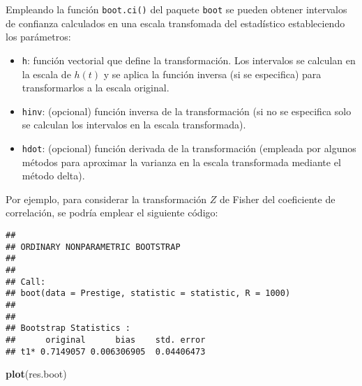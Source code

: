 \documentclass[
]{book}
\newenvironment{Shaded}{\begin{snugshade}}{\end{snugshade}}
\newcommand{\ControlFlowTok}[1]{\textcolor[rgb]{0.13,0.29,0.53}{\textbf{#1}}}
\newcommand{\DataTypeTok}[1]{\textcolor[rgb]{0.13,0.29,0.53}{#1}}
\newcommand{\DecValTok}[1]{\textcolor[rgb]{0.00,0.00,0.81}{#1}}
\newcommand{\KeywordTok}[1]{\textcolor[rgb]{0.13,0.29,0.53}{\textbf{#1}}}
\newcommand{\NormalTok}[1]{#1}
\newcommand{\OperatorTok}[1]{\textcolor[rgb]{0.81,0.36,0.00}{\textbf{#1}}}
\newcommand{\StringTok}[1]{\textcolor[rgb]{0.31,0.60,0.02}{#1}}
\theoremstyle{definition}
\theoremstyle{definition}
\theoremstyle{definition}
\theoremstyle{remark}
\begin{document}
Empleando la función \texttt{boot.ci()} del paquete \texttt{boot} se pueden obtener intervalos de confianza
calculados en una escala transfomada del estadístico estableciendo los parámetros:

\begin{itemize}
\item
  \texttt{h}: función vectorial que define la transformación.
  Los intervalos se calculan en la escala de \(h(t)\) y se aplica la función inversa
  (si se especifica) para transformarlos a la escala original.
\item
  \texttt{hinv}: (opcional) función inversa de la transformación
  (si no se especifica solo se calculan los intervalos en la escala transformada).
\item
  \texttt{hdot}: (opcional) función derivada de la transformación
  (empleada por algunos métodos para aproximar la varianza en la escala transformada
  mediante el método delta).
\end{itemize}

Por ejemplo, para considerar la transformación \(Z\) de Fisher del coeficiente de correlación,
se podría emplear el siguiente código:

\begin{Shaded}
\end{Shaded}

\begin{verbatim}
## 
## ORDINARY NONPARAMETRIC BOOTSTRAP
## 
## 
## Call:
## boot(data = Prestige, statistic = statistic, R = 1000)
## 
## 
## Bootstrap Statistics :
##      original      bias    std. error
## t1* 0.7149057 0.006306905  0.04406473
\end{verbatim}

\begin{Shaded}
\begin{Highlighting}[]
\KeywordTok{plot}\NormalTok{(res.boot)}
\end{Highlighting}
\end{Shaded}
\end{document}
